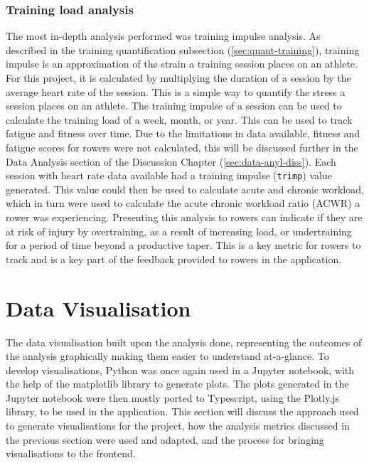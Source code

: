 \subsubsection{Training load analysis}
The most in-depth analysis performed was training impulse analysis. As described in the training quantification subsection (\autoref{sec:quant-training}), training impulse is an approximation of the strain a training session places on an athlete. For this project, it is calculated by multiplying the duration of a session by the average heart rate of the session. This is a simple way to quantify the stress a session places on an athlete. The training impulse of a session can be used to calculate the training load of a week, month, or year. This can be used to track fatigue and fitness over time. Due to the limitations in data available, fitness and fatigue scores for rowers were not calculated, this will be discussed further in the Data Analysis section of the Discussion Chapter (\ref{sec:data-anyl-diss}).
Each session with heart rate data available had a training impulse (\texttt{trimp}) value generated. This value could then be used to calculate acute and chronic workload, which in turn were used to calculate the acute chronic workload ratio (ACWR) a rower was experiencing. Presenting this analysis to rowers can indicate if they are at risk of injury by overtraining, as a result of increasing load, or undertraining for a period of time beyond a productive taper. This is a key metric for rowers to track and is a key part of the feedback provided to rowers in the application.

\section{\label{sec:data-viz}Data Visualisation}
The data visualisation built upon the analysis done, representing the outcomes of the analysis graphically making them easier to understand at-a-glance. To develop visualisations, Python was once again used in a Jupyter notebook, with the help of the matplotlib library to generate plots. The plots generated in the Jupyter notebook were then mostly ported to Typescript, using the Plotly.js library, to be used in the application. This section will discuss the approach used to generate visualisations for the project, how the analysis metrics discussed in the previous section were used and adapted, and the process for bringing visualisations to the frontend.

